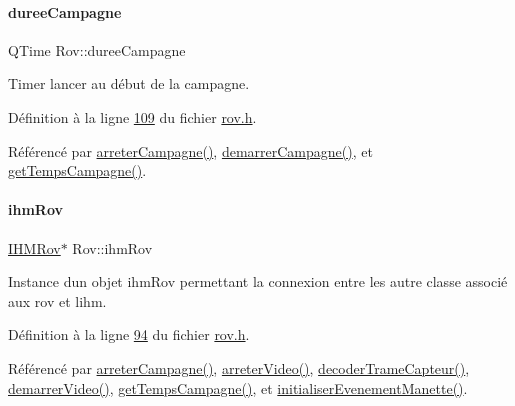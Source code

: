 \mbox{\label{class_rov_a148a0ff28fc2dbed7b65466d77297b8a}} 
\paragraph{\texorpdfstring{duree\+Campagne}{dureeCampagne}}
{\footnotesize\ttfamily Q\+Time Rov\+::duree\+Campagne\hspace{0.3cm}{\ttfamily [private]}}



Timer lancer au début de la campagne. 



Définition à la ligne \hyperlink{rov_8h_source_l00109}{109} du fichier \hyperlink{rov_8h_source}{rov.\+h}.



Référencé par \hyperlink{rov_8cpp_source_l00136}{arreter\+Campagne()}, \hyperlink{rov_8cpp_source_l00123}{demarrer\+Campagne()}, et \hyperlink{rov_8cpp_source_l00154}{get\+Temps\+Campagne()}.

\mbox{\label{class_rov_a9b1c1c3b4e268a32e69b2ea4c863b817}} 
\paragraph{\texorpdfstring{ihm\+Rov}{ihmRov}}
{\footnotesize\ttfamily \hyperlink{class_i_h_m_rov}{I\+H\+M\+Rov}$\ast$ Rov\+::ihm\+Rov\hspace{0.3cm}{\ttfamily [private]}}



Instance d\textquotesingle{}un objet ihm\+Rov permettant la connexion entre les autre classe associé aux rov et l\textquotesingle{}ihm. 



Définition à la ligne \hyperlink{rov_8h_source_l00094}{94} du fichier \hyperlink{rov_8h_source}{rov.\+h}.



Référencé par \hyperlink{rov_8cpp_source_l00136}{arreter\+Campagne()}, \hyperlink{rov_8cpp_source_l00263}{arreter\+Video()}, \hyperlink{rov_8cpp_source_l00086}{decoder\+Trame\+Capteur()}, \hyperlink{rov_8cpp_source_l00161}{demarrer\+Video()}, \hyperlink{rov_8cpp_source_l00154}{get\+Temps\+Campagne()}, et \hyperlink{rov_8cpp_source_l00052}{initialiser\+Evenement\+Manette()}.

